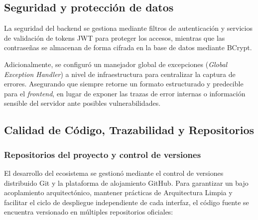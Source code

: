 \documentclass[12pt, atypical, journal]{article}
\begin{document}
\subsection{Seguridad y protección de datos}
La seguridad del backend se gestiona mediante filtros de autenticación y servicios de validación de tokens JWT para proteger los accesos, mientras que las contraseñas se almacenan de forma cifrada en la base de datos mediante BCrypt.

Adicionalmente, se configuró un manejador global de excepciones (\textit{Global Exception Handler}) a nivel de infraestructura para centralizar la captura de errores. Asegurando que siempre retorne un formato estructurado y predecible para el \textit{frontend}, en lugar de exponer las trazas de error internas o información sensible del servidor ante posibles vulnerabilidades.

\subsection{Calidad de Código, Trazabilidad y Repositorios}

\subsubsection{Repositorios del proyecto y control de versiones}
El desarrollo del ecosistema se gestionó mediante el control de versiones distribuido Git y la plataforma de alojamiento GitHub. Para garantizar un bajo acoplamiento arquitectónico, mantener prácticas de Arquitectura Limpia y facilitar el ciclo de despliegue independiente de cada interfaz, el código fuente se encuentra versionado en múltiples repositorios oficiales:
\end{document}
